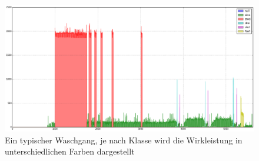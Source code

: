 \begin{figure}[ht]
\includegraphics[height=0.8\textwidth , angle=90]{1_Grafiken/classes0.png}
	\caption[Typischer Waschgang, farbig annotiert]{Ein typischer Waschgang, je nach Klasse wird die Wirkleistung in unterschiedlichen Farben dargestellt}
\label{typWasch}
\end{figure}
